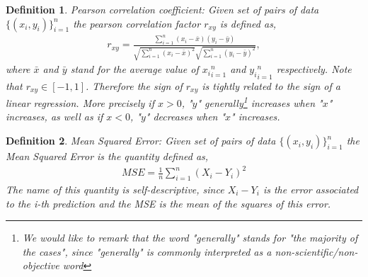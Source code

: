\documentclass[11pt]{article}
\newtheorem{definition}{Definition}
\begin{document}
\begin{definition}\label{definitionPersonCoefficient}
Pearson correlation coefficient: Given set of pairs of data $\{(x_i,y_i)\}_{i=1}^n$ the pearson correlation factor $r_{xy}$ is defined as,
\begin{align}
r_{xy}=\frac{\sum_{i=1}^n(x_i-\bar{x})(y_i-\bar{y})}{\sqrt{\sum_{i=1}^n(x_i-\bar{x})^2}\sqrt{\sum_{i=1}^n(y_i-\bar{y})^2}},
\end{align}
where $\bar{x}$ and $\bar{y}$ stand for the average value of ${x_i}_{i=1}^n$ and ${y_i}_{i=1}^n$ respectively. Note that $r_{xy}\in[-1,1]$. Therefore the sign of $r_{xy}$ is tightly related to the sign of a linear regression. More precisely if $x>0$, "$y$" generally\footnote{We would like to remark that the word "generally" stands for "the majority of the cases", since "generally" is commonly interpreted as a non-scientific/non-objective word} increases when "$x$" increases, as well as if $x<0$, "$y$" decreases when "$x$" increases.
\end{definition}

\begin{definition}\label{definitionMeanSquaredError}
Mean Squared Error: Given set of pairs of data $\{(x_i,y_i)\}_{i=1}^n$ the Mean Squared Error is the quantity defined as,
\begin{align}
	MSE=\frac{1}{n}\sum_{i=1}^n(X_i-Y_i)^2
\end{align}
The name of this quantity is self-descriptive, since $X_i-Y_i$ is the error associated to the i-th prediction and the MSE is the mean of the squares of this error.
\end{definition}
\end{document}
